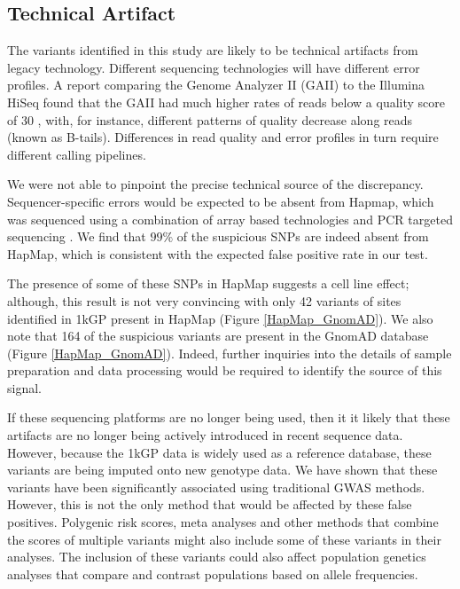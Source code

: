 \documentclass[9pt,lineno]{elife}
\begin{document}
\subsection{Technical Artifact}
The variants identified in this study are likely to be technical artifacts from legacy technology.
Different sequencing technologies will have different error profiles. 
A report comparing the Genome Analyzer II (GAII) to the Illumina HiSeq found that the GAII had much higher rates of reads below a quality score of 30 \citep{Minoche2011}, with, for instance, different patterns of quality decrease along reads (known as B-tails). 
Differences in read quality and error profiles in turn require different calling pipelines.

We were not able to pinpoint the precise technical source of the discrepancy. 
Sequencer-specific errors would be expected to be absent from Hapmap, which was sequenced using a combination of array based technologies and PCR targeted sequencing \citep{HapMap2005}. 
We find that $99\%$ of the suspicious SNPs are indeed absent from HapMap, which is consistent with the expected false positive rate in our test.
  
The presence of some of these SNPs in HapMap suggests a cell line effect; although, this result is not very convincing with only 42 variants of sites identified in 1kGP present in HapMap (Figure \ref{HapMap_GnomAD}).
We also note that 164 of the suspicious variants are present in the GnomAD database (Figure \ref{HapMap_GnomAD}).
Indeed, further inquiries into the details of sample preparation and data processing would be required to identify the source of this signal.

If these sequencing platforms are no longer being used, then it it likely that these artifacts are no longer being actively introduced in recent sequence data.
However, because the 1kGP data is widely used as a reference database, these variants are being imputed onto new genotype data.
We have shown that these variants have been significantly associated using traditional GWAS methods.
However, this is not the only method that would be affected by these false positives. 
Polygenic risk scores, meta analyses and other methods that combine the scores of multiple variants might also include some of these variants in their analyses.
The inclusion of these variants could also affect population genetics analyses that compare and contrast populations based on allele frequencies.
\end{document}
